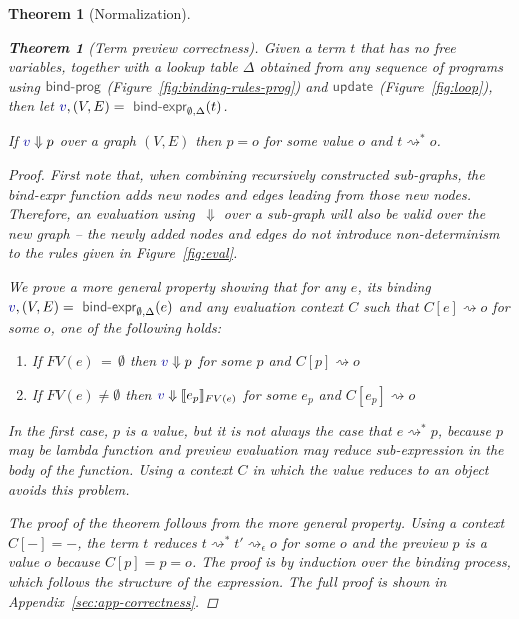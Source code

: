 \documentclass[acmsmall,anonymous,fleqn]{acmart}\settopmatter{printfolios=false,printccs=false,printacmref=false}
\newcounter{thc}
\theoremstyle{plain}
\newtheorem{theorem}[thc]{Theorem}
\theoremstyle{definition}
\newcommand{\ident}[1]{\textnormal{\textcolor{idclr}{\sffamily #1}}}
\newcommand{\bndclr}[1]{\textcolor{kvdclr}{#1}}
\begin{document}
\begin{theorem}[Normalization]
\begin{theorem}[Term preview correctness]
\label{thm:let-free-correct}
Given a term $t$ that has no free variables, together with a lookup table $\Delta$ obtained
from any sequence of programs using $\ident{bind-prog}$ (Figure~\ref{fig:binding-rules-prog}) and
$\ident{update}$ (Figure~\ref{fig:loop}), then
let $\bndclr{v}, (V, E) = \ident{bind-expr}_{\emptyset, \Delta}(t)$.

\vspace{0.25em}
\noindent
If $\bndclr{v}\Downarrow p$
over a graph $(V, E)$ then $p = o$ for some value $o$ and $t \rightsquigarrow^{*} o$.
\end{theorem}

\begin{proof}
First note that, when combining recursively constructed sub-graphs, the \ident{bind-expr} function
adds new nodes and edges leading from those new nodes. Therefore, an evaluation using~$\Downarrow$
over a sub-graph will also be valid over the new graph -- the newly added nodes and edges do not introduce
non-determinism to the rules given in Figure~\ref{fig:eval}.

We prove a more general property showing that for any $e$, its binding
$\bndclr{v}, (V, E) = \ident{bind-expr}_{\emptyset, \Delta}(e)$ and any evaluation context $C$
such that $C[e]\rightsquigarrow o$ for some $o$, one of the following holds:
%
\begin{enumerate}
\item[a.] If $FV(e)\,=\,\emptyset$ then $\bndclr{v} \Downarrow p$ for some $p$ and $C[p] \rightsquigarrow o$
\item[b.] If $FV(e)\neq\emptyset$ then $\bndclr{v} \Downarrow \llbracket e_p \rrbracket_{FV(e)}$ for some $e_p$ and $C[e_p] \rightsquigarrow o$
\end{enumerate}
%
In the first case, $p$ is a value, but it is not always the case that $e \rightsquigarrow^{*} p$,
because $p$ may be lambda function and preview evaluation may reduce sub-expression in the body of
the function. Using a context $C$ in which the value reduces to an object avoids this problem.

The proof of the theorem follows from the more general property. Using a context $C[-]=-$, the
term $t$ reduces $t \rightsquigarrow^{*}t' \rightsquigarrow_\epsilon o$ for some $o$ and the
preview $p$ is a value $o$ because $C[p] = p = o$.
The proof is by induction over the binding process, which follows the structure of the expression.
The full proof is shown in Appendix~\ref{sec:app-correctness}.
\end{proof}


\end{theorem}
\end{document}
